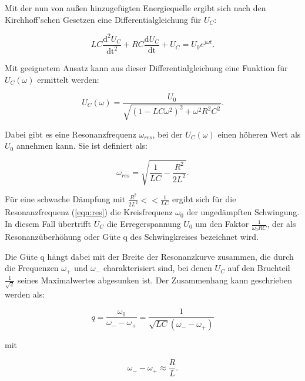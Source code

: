 \noindent
Mit der nun von außen hinzugefügten Energiequelle ergibt sich nach den Kirchhoff'schen Gesetzen eine Differentialgleichung für $U_C$:

\begin{equation}
LC \frac{\text{d}^2 U_C}{\text{dt}^2} + RC \frac{\text{d} U_C}{\text{dt}} + U_C = U_0 e^{j \omega t}.
\end{equation}

\noindent
Mit geeignetem Ansatz kann aus dieser Differentialgleichung eine Funktion für $U_C(\omega)$ ermittelt werden:

\begin{equation}
U_C(\omega) = \frac{U_0}{\sqrt{(1-LC\omega^2)^2 + \omega^2 R^2 C^2}}.
\label{eqn:uc}
\end{equation}

\noindent
Dabei gibt es eine Resonanzfrequenz $\omega_{res}$, bei der $U_C(\omega)$ einen höheren Wert als $U_0$ annehmen kann.
Sie ist definiert als:

\begin{equation}
\omega_{res} = \sqrt{\frac{1}{LC} - \frac{R^2}{2L^2}}.
\label{eqn:res}
\end{equation}

\noindent
Für eine schwache Dämpfung mit $\frac{R^2}{2L^2} << \frac{1}{LC}$ ergibt sich für die Resonanzfrequenz (\ref{eqn:res}) die Kreisfrequenz $\omega_0$ der ungedämpften Schwingung.
In diesem Fall übertrifft $U_C$ die Erregerspannung $U_0$ um den Faktor $\frac{1}{\omega_0 RC}$, 
der als Resonanzüberhöhung oder Güte q des Schwingkreises bezeichnet wird.

\noindent
Die Güte q hängt dabei mit der Breite der Resonanzkurve zusammen, 
die durch die Frequenzen $\omega_+$ und $\omega_-$ charakterisiert sind,
bei denen $U_C$ auf den Bruchteil $\frac{1}{\sqrt{2}}$ seines Maximalwertes abgesunken ist.
Der Zusammenhang kann geschrieben werden als:

\begin{equation}
q = \frac{\omega_0}{\omega_- - \omega_+}= \frac{1}{\sqrt{LC}(\omega_- - \omega_+)}
\label{eqn:guete}
\end{equation}

\noindent
mit

\begin{equation}
    \omega_- - \omega_+ \approx \frac{R}{L}.
    \label{eqn:wmp}
\end{equation}
 


